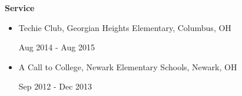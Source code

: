 \documentclass[letterpaper,11pt]{article}
\newlength \firstcol
\newcommand{\resheading}[1]{{\large \colorbox{mygrey}{\begin{minipage}{\textwidth}{\textbf{#1\vphantom{p\^{E}}}}\end{minipage}}}}
\newcommand{\reitem}[2]{
\begin{minipage}[t]{\firstcol}
#2
\end{minipage}
\null\hfill
\begin{minipage}[t]{4cm}
\flushright
#1
\end{minipage}
}
\newcommand{\heading}[4]{
\vspace{#1}
\begin{minipage}{8cm}
\flushleft
\textbf{#2}
\end{minipage}
\null\hfill
\begin{minipage}{7cm}
\flushright 
\textbf{#3}
\end{minipage}
\vspace{#4}
}
\begin{document}
\resheading{Service}
\begin{itemize}
\item[] \reitem{Aug 2014 - Aug 2015}{Techie Club, Georgian Heights Elementary, Columbus, OH}
\item[] \reitem{Sep 2012 - Dec 2013}{A Call to College, Newark Elementary Schools, Newark, OH}
\end{itemize}
\end{document}
